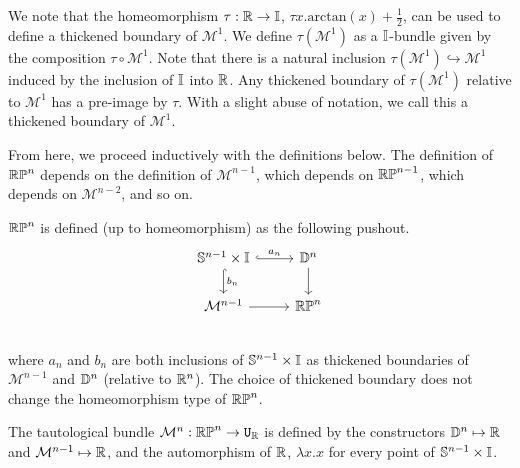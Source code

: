 \documentclass{amsart}
\begin{document}
We note that the homeomorphism $\tau: \mathbb{R} \rightarrow \mathbb{I}$, $\tau x. \text{arctan}(x)+ \frac{1}{2}$, can be used to define a thickened boundary of $\mathcal{M}^1$. We define $\tau(\mathcal{M}^1)$ as a $\mathbb{I}$-bundle given by the composition $\tau \circ \mathcal{M}^1$.  Note that there is a natural inclusion $\tau(\mathcal{M}^1) \hookrightarrow \mathcal{M}^1$ induced by the inclusion of $\mathbb{I}$ into $\mathbb{R}$. Any thickened boundary of $\tau(\mathcal{M}^1)$ relative to $\mathcal{M}^1$ has a pre-image by $\tau$. With a slight abuse of notation, we call this a thickened boundary of $\mathcal{M}^1$. 

From here, we proceed inductively with the definitions below. The definition of $\mathbb{RP}^n$ depends on the definition of $\mathcal{M}^{n-1}$, which depends on $\mathbb{RP}^{n-1}$, which depends on $\mathcal{M}^{n-2}$, and so on.

\begin{definition} $\mathbb{RP}^n$ is defined (up to homeomorphism) as the following pushout.\\
\[\begin{tikzcd}
\set{S}^{n-1} \times \set{I} \arrow[r, hook, "a_n"] \arrow[d, hook, "b_n" ] &\set{D}^{n} \arrow[d]\\
\mathcal{M}^{n-1} \arrow[r] &\set{RP}^n\\
\end{tikzcd}
\] where $a_n$ and $b_n$ are both inclusions of $\mathbb{S}^{n-1} \times \mathbb{I} $ as thickened boundaries of $\mathcal{M}^{n-1}$ and $\mathbb{D}^{n}$ (relative to $\mathbb{R}^n$). The choice of thickened boundary does not change the homeomorphism type of $\mathbb{RP}^n$.
\end{definition}

\begin{definition}
\label{defn:tautologicalbundle}
The tautological bundle $\mathcal{M}^n: \mathbb{RP}^n \rightarrow \mathtt{U}_{\mathbb{R}}$ is defined by the constructors $\mathbb{D}^n \mapsto \mathbb{R}$ and $\mathcal{M}^{n-1} \mapsto \mathbb{R}$, and the automorphism of $\mathbb{R}$, $\lambda x.x$ for every point of $\mathbb{S}^{n-1} \times \mathbb{I}$.
\end{definition}

\end{document}
